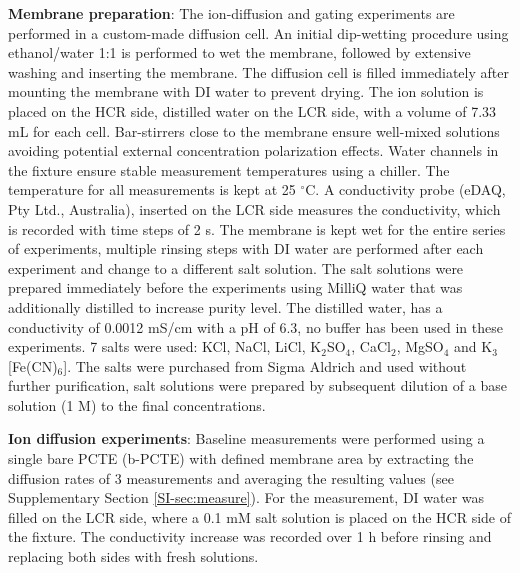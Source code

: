 \vspace{1em}
\noindent
\textbf{Membrane preparation}: The ion-diffusion and gating experiments are
performed in a custom-made diffusion cell. An initial dip-wetting
procedure using ethanol/water 1:1 is performed to wet the membrane,
followed by extensive washing and inserting the membrane. The
diffusion cell is filled immediately after mounting the membrane with
DI water to prevent drying. The ion solution is placed on the HCR
side, distilled water on the LCR side, with a volume of 7.33 mL for
each cell. Bar-stirrers close to the membrane ensure well-mixed
solutions avoiding potential external concentration polarization
effects. Water channels in the fixture ensure stable measurement
temperatures using a chiller. The temperature for all measurements is
kept at 25 $^{\circ}$C. A conductivity probe (eDAQ, Pty Ltd.,
Australia), inserted on the LCR side measures the conductivity, which
is recorded with time steps of 2 s. The membrane is kept wet for the
entire series of experiments, multiple rinsing steps with DI water are
performed after each experiment and change to a different salt
solution. The salt solutions were prepared immediately before the
experiments using MilliQ water that was additionally distilled to
increase purity level. The distilled water, has a conductivity of
0.0012 mS/cm with a pH of 6.3, no buffer has been used in these
experiments. 7 salts were used: KCl, NaCl, LiCl, K$_{2}$SO$_{4}$,
CaCl$_{2}$, MgSO$_{4}$ and K$_{3}$[Fe(CN)$_{6}$]. The salts were
purchased from Sigma Aldrich and used without further purification,
salt solutions were prepared by subsequent dilution of a base solution
(1 M) to the final concentrations.

\vspace{1em}
\noindent
\textbf{Ion diffusion experiments}: { Baseline measurements were
performed using a single bare PCTE (b-PCTE) with defined membrane area} by extracting the diffusion rates
of 3 measurements and averaging the resulting values (see
Supplementary Section \autoref{SI-sec:measure}). For the measurement, DI water was filled on
the LCR side, where a 0.1 mM salt solution is placed on the HCR side
of the fixture. The conductivity increase was recorded over 1 h before
rinsing and replacing both sides with fresh solutions.

